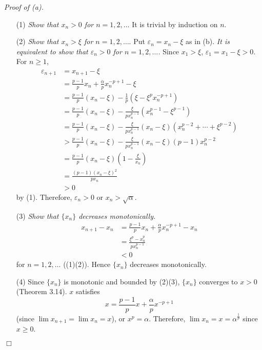 \documentclass{article}
\begin{document}
\emph{Proof of (a).}
\begin{enumerate}
  \item[(1)]
  \emph{Show that $x_n > 0$ for $n=1,2,\ldots$}
  It is trivial by induction on $n$.
  \item[(2)]
  \emph{Show that $x_n > \xi$ for $n=1,2,\ldots$}.
  Put $\varepsilon_n = x_n - \xi$ as in (b).
  \emph{It is equivalent to show that $\varepsilon_n > 0$ for $n=1,2,\ldots$.}
  Since $x_1 > \xi$,
  $\varepsilon_1 = x_1 - \xi > 0$. For $n \geq 1$,
  \begin{align*}
    \varepsilon_{n+1}
    &= x_{n+1} - \xi \\
    &= \frac{p-1}{p} x_n + \frac{\alpha}{p} x_n^{-p+1} - \xi \\
    &= \frac{p-1}{p} (x_n-\xi)
      - \frac{1}{p}\left( \xi - \xi^p x_n^{-p+1} \right) \\
    &= \frac{p-1}{p} (x_n-\xi)
      - \frac{\xi}{p x_n^{p-1}}( x_n^{p-1} - \xi^{p-1} ) \\
    &= \frac{p-1}{p} (x_n-\xi)
      - \frac{\xi}{p x_n^{p-1}}(x_n - \xi)( x_n^{p-2} + \cdots + \xi^{p-2} ) \\
    &> \frac{p-1}{p} (x_n-\xi)
      - \frac{\xi}{p x_n^{p-1}}(x_n - \xi)(p-1)x_n^{p-2} \\
    &= \frac{p-1}{p} (x_n-\xi)\left( 1 - \frac{\xi}{x_n} \right) \\
    &= \frac{(p-1)(x_n-\xi)^2}{p x_n} \\
    &> 0
  \end{align*}
  by (1).
  Therefore, $\varepsilon_n > 0$ or $x_n > \sqrt{\alpha}$.
  \item[(3)]
  \emph{Show that $\{x_n\}$ decreases monotonically.}
  \begin{align*}
    x_{n+1} - x_n
    &= \frac{p-1}{p} x_n + \frac{\alpha}{p} x_n^{-p+1} - x_n \\
    &= \frac{\xi^p - x_n^p}{p x_n^{p-1}} \\
    &< 0
  \end{align*}
  for $n = 1,2,\ldots$ ((1)(2)).
  Hence $\{x_n\}$ decreases monotonically.
  \item[(4)]
  Since $\{x_n\}$ is monotonic and bounded by (2)(3),
  $\{x_n\}$ converges to $x > 0$ (Theorem 3.14).
  $x$ satisfies $$x = \frac{p-1}{p} x + \frac{\alpha}{p} x^{-p+1}$$
  (since $\lim x_{n+1} = \lim x_n = x$),
  or $x^p = \alpha$.
  Therefore, $\lim x_n = x = \alpha^{\frac{1}{p}}$ since $x \geq 0$.
\end{enumerate}
$\Box$ \\
\end{document}
